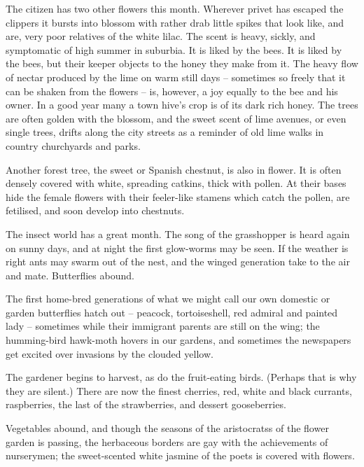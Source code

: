 The citizen has two other flowers this month. Wherever privet has escaped the clippers it bursts into blossom with rather drab little spikes that look like, and are, very poor relatives of the white lilac. The scent is heavy, sickly, and symptomatic of high summer in suburbia. It is liked by the bees. It is liked by the bees, but their keeper objects to the honey they make from it. The heavy flow of nectar produced by the lime on warm still days -- sometimes so freely that it can be shaken from the flowers -- is, however, a joy equally to the bee and his owner. In a good year many a town hive's crop is of its dark rich honey. The trees are often golden with the blossom, and the sweet scent of lime avenues, or even single trees, drifts along the city streets as a reminder of old lime walks in country churchyards and parks.

Another forest tree, the sweet or Spanish chestnut, is also in flower. It is often densely covered with white, spreading catkins, thick with pollen. At their bases hide the female flowers with their feeler-like stamens which catch the pollen, are fetilised, and soon develop into chestnuts.

The insect world has a great month. The song of the grasshopper is heard again on sunny days, and at night the first glow-worms may be seen. If the weather is right ants may swarm out of the nest, and the winged generation take to the air and mate. Butterflies abound.

The first home-bred generations of what we might call our own domestic or garden butterflies hatch out -- peacock, tortoiseshell, red admiral and painted lady -- sometimes while their immigrant parents are still on the wing; the humming-bird hawk-moth hovers in our gardens, and sometimes the newspapers get excited over invasions by the clouded yellow.

The gardener begins to harvest, as do the fruit-eating birds. (Perhaps that is why they are silent.)  There are now the finest cherries, red, white and black currants, raspberries, the last of the strawberries, and dessert gooseberries.

Vegetables abound, and though the seasons of the aristocratss of the flower garden is passing, the herbaceous borders are gay with the achievements of nurserymen; the sweet-scented white jasmine of the poets is covered with flowers.
